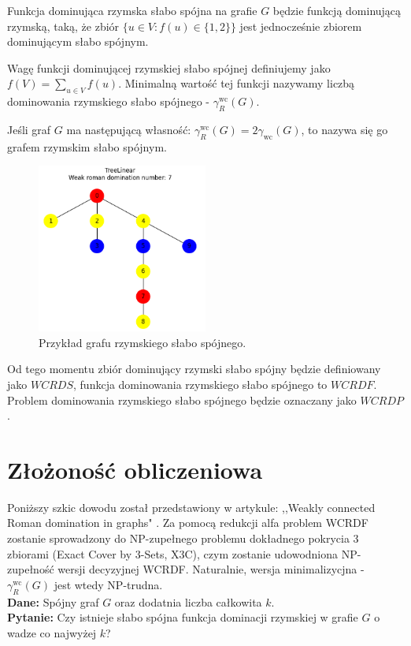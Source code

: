 \begin{definition}
    Funkcja dominująca rzymska słabo spójna na grafie $G$ będzie funkcją dominującą rzymską, taką, że zbiór $\{u \in V: f(u) \in \{1,2\}\}$ jest jednocześnie zbiorem dominującym słabo spójnym.
\end{definition}

\begin{definition}
    Wagę funkcji dominującej rzymskiej słabo spójnej definiujemy jako $f(V) = \sum_{u \in V}{f(u)}$. Minimalną wartość tej funkcji nazywamy liczbą dominowania rzymskiego słabo spójnego - $\gamma_{R}^{\text{wc}}(G)$. 
\end{definition}

\begin{definition}
    Jeśli graf $G$ ma następującą własność: $\gamma_{R}^{\text{wc}}(G) = 2\gamma_{\text{wc}}(G)$, to nazywa się go grafem rzymskim słabo spójnym.
\end{definition}

\begin{figure}[H]
    \centering
    \includegraphics[width=0.5\textwidth]{assets/phase2.png}
    \caption{Przykład grafu rzymskiego słabo spójnego.}
    \label{fig:przykladWCRDF}
\end{figure}

Od tego momentu zbiór dominujący rzymski słabo spójny będzie definiowany jako $WCRDS$, funkcja dominowania rzymskiego słabo spójnego to $WCRDF$. Problem dominowania rzymskiego słabo spójnego będzie oznaczany jako $WCRDP$.

\section{Złożoność obliczeniowa}
Poniższy szkic dowodu został przedstawiony w artykule: ,,Weakly connected Roman domination in graphs" \cite{theoryWCRDF}. 
Za pomocą redukcji alfa problem WCRDF zostanie sprowadzony do NP-zupełnego problemu dokładnego pokrycia 3 zbiorami (Exact Cover by 3-Sets, X3C)\cite{X3C}, czym zostanie udowodniona NP-zupełność wersji decyzyjnej WCRDF. Naturalnie, wersja minimalizycjna -  $\gamma_{R}^{\text{wc}}(G)$ jest wtedy NP-trudna.\\
\textbf{Dane:} Spójny graf $G$ oraz dodatnia liczba całkowita $k$.\\
\textbf{Pytanie:} Czy istnieje słabo spójna funkcja dominacji rzymskiej w grafie $G$ o wadze co najwyżej $k$?\\

